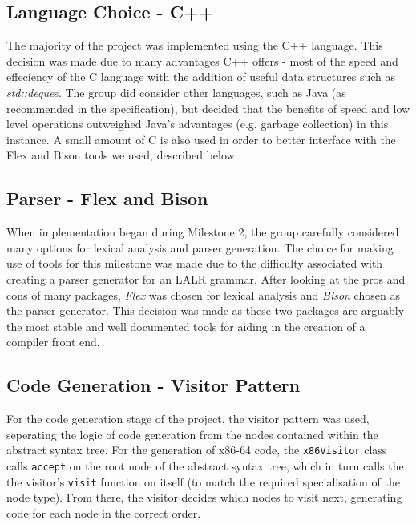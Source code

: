 \documentclass[a4wide, 11pt]{article}
\begin{document}
\subsection{Language Choice - C++}
The majority of the project was implemented using the C++ language. This
decision was made due to many advantages C++ offers - most of the speed and
effeciency of the C language with the addition of useful data structures such
as \emph{std::deque}s. The group did consider other languages, such as Java (as
recommended in the specification), but decided that the benefits of speed and
low level operations outweighed Java's advantages (e.g. garbage collection) in
this instance. A small amount of C is also used in order to better interface
with the Flex and Bison tools we used, described below.

\newpage

\subsection{Parser - Flex and Bison}

When implementation began during Milestone 2, the group carefully considered
many options for lexical analysis and parser generation. The choice for making 
use of tools for this milestone was made due to the difficulty associated with
creating a parser generator for an LALR grammar. After looking at the
pros and cons of many packages, \emph{Flex} was chosen for lexical analysis
and \emph{Bison} chosen as the parser generator. This decision was made as 
these two packages are arguably the most stable and well documented tools for 
aiding in the creation of a compiler front end.

\subsection{Code Generation - Visitor Pattern}

For the code generation stage of the project, the visitor pattern was used, 
seperating the logic of code generation from the nodes contained within the
abstract syntax tree. For the generation of x86-64 code, the \texttt{x86Visitor}
class calls \texttt{accept} on the root node of the abstract syntax tree, which
in turn calls the the visitor's \texttt{visit} function on itself (to match
the required specialisation of the node type). From there, the visitor decides
which nodes to visit next, generating code for each node in the correct order. 
\end{document}
